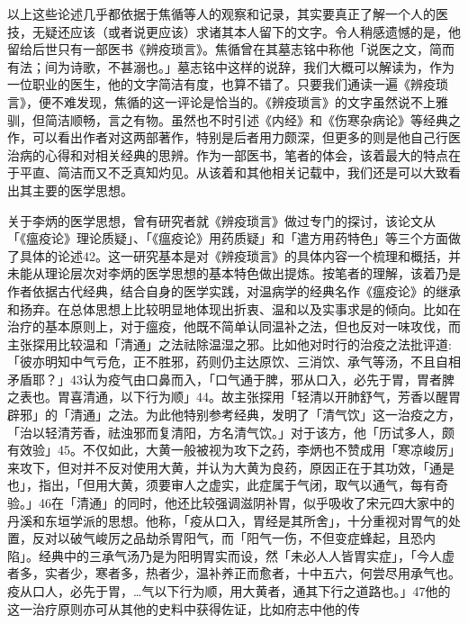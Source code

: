 以上这些论述几乎都依据于焦循等人的观察和记录，其实要真正了解一个人的医技，无疑还应该（或者说更应该）求诸其本人留下的文字。令人稍感遗憾的是，他留给后世只有一部医书《辨疫琐言》。焦循曾在其墓志铭中称他「说医之文，简而有法；间为诗歌，不甚溺也。」墓志铭中这样的说辞，我们大概可以解读为，作为一位职业的医生，他的文字简洁有度，也算不错了。只要我们通读一遍《辨疫琐言》，便不难发现，焦循的这一评论是恰当的。《辨疫琐言》的文字虽然说不上雅驯，但简洁顺畅，言之有物。虽然也不时引述《内经》和《伤寒杂病论》等经典之作，可以看出作者对这两部著作，特别是后者用力颇深，但更多的则是他自己行医治病的心得和对相关经典的思辨。作为一部医书，笔者的体会，该着最大的特点在于平直、简洁而又不乏真知灼见。从该着和其他相关记载中，我们还是可以大致看出其主要的医学思想。

\vfill
\begin{BookNotes}
\end{BookNotes}

关于李炳的医学思想，曾有研究者就《辨疫琐言》做过专门的探讨，该论文从「《瘟疫论》理论质疑」、「《瘟疫论》用药质疑」和「遣方用药特色」等三个方面做了具体的论述42。这一研究基本是对《辨疫琐言》的具体内容一个梳理和概括，并未能从理论层次对李炳的医学思想的基本特色做出提炼。按笔者的理解，该着乃是作者依据古代经典，结合自身的医学实践，对温病学的经典名作《瘟疫论》的继承和扬弃。在总体思想上比较明显地体现出折衷、温和以及实事求是的倾向。比如在治疗的基本原则上，对于瘟疫，他既不简单认同温补之法，但也反对一味攻伐，而主张探用比较温和「清通」之法祛除温湿之邪。比如他对时行的治疫之法批评道:「彼亦明知中气亏危，正不胜邪，药则仍主达原饮、三消饮、承气等汤，不且自相矛盾耶？」43认为疫气由口鼻而入，「口气通于脾，邪从口入，必先于胃，胃者脾之表也。胃喜清通，以下行为顺」44。故主张探用「轻清以开肺舒气，芳香以醒胃辟邪」的「清通」之法。为此他特别参考经典，发明了「清气饮」这一治疫之方，「治以轻清芳香，祛浊邪而复清阳，方名清气饮。」对于该方，他「历试多人，颇有效验」45。不仅如此，大黄一般被视为攻下之药，李炳也不赞成用「寒凉峻厉」来攻下，但对并不反对使用大黄，并认为大黄为良药，原因正在于其功效，「通是也」，指出，「但用大黄，须要审人之虚实，此症属于气闭，取气以通气，每有奇验。」46在「清通」的同时，他还比较强调滋阴补胃，似乎吸收了宋元四大家中的丹溪和东垣学派的思想。他称，「疫从口入，胃经是其所舍」，十分重视对胃气的处置，反对以破气峻厉之品劫杀胃阳气，而「阳气一伤，不但变症蜂起，且恐内陷」。经典中的三承气汤乃是为阳明胃实而设，然「未必人人皆胃实症」，「今人虚者多，实者少，寒者多，热者少，温补养正而愈者，十中五六，何尝尽用承气也。疫从口人，必先于胃，…气以下行为顺，用大黄者，通其下行之道路也。」47他的这一治疗原则亦可从其他的史料中获得佐证，比如府志中他的传

